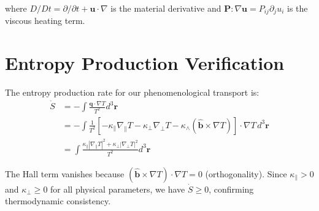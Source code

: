 \documentclass[12pt,a4paper]{article}
\newcommand{\vect}[1]{\mathbf{#1}}
\newcommand{\tensor}[1]{\boldsymbol{#1}}
\begin{document}
where $D/Dt = \partial/\partial t + \vect{u} \cdot \nabla$ is the material derivative and $\tensor{P} : \nabla\vect{u} = P_{ij}\partial_j u_i$ is the viscous heating term.

\section{Entropy Production Verification}

The entropy production rate for our phenomenological transport is:
\begin{align}
\dot{S} &= -\int \frac{\vect{q} \cdot \nabla T}{T^2} d^3\vect{r}\label{eq:entropy_rate}\\
&= -\int \frac{1}{T^2}\left[-\kappa_{\parallel} \nabla_{\parallel} T - \kappa_{\perp} \nabla_{\perp} T - \kappa_{\wedge} (\hat{\vect{b}} \times \nabla T)\right] \cdot \nabla T \, d^3\vect{r}\label{eq:entropy_substituted}\\
&= \int \frac{\kappa_{\parallel} |\nabla_{\parallel} T|^2 + \kappa_{\perp} |\nabla_{\perp} T|^2}{T^2} d^3\vect{r}\label{eq:entropy_final}
\end{align}

The Hall term vanishes because $(\hat{\vect{b}} \times \nabla T) \cdot \nabla T = 0$ (orthogonality). Since $\kappa_{\parallel} > 0$ and $\kappa_{\perp} \geq 0$ for all physical parameters, we have $\dot{S} \geq 0$, confirming thermodynamic consistency.
\end{document}
